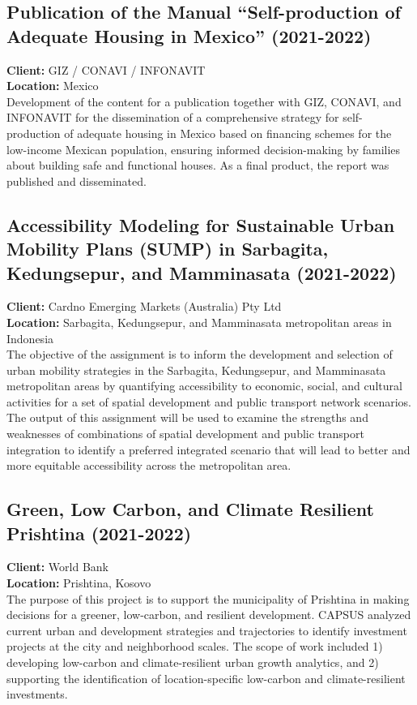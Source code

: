 \documentclass[
	a4paper,
	12pt,
	unnumberedsections,
]{CSSullivanBusinessReport}
\begin{document}
\subsection{Publication of the Manual “Self-production of Adequate Housing in Mexico” (2021-2022)}
\textbf{Client:}  GIZ / CONAVI / INFONAVIT \\
\textbf{Location:}  Mexico \\[0.5em]
 Development of the content for a publication together with GIZ, CONAVI, and INFONAVIT for the dissemination of a comprehensive strategy for self-production of adequate housing in Mexico based on financing schemes for the low-income Mexican population, ensuring informed decision-making by families about building safe and functional houses. As a final product, the report was published and disseminated.

\subsection{Accessibility Modeling for Sustainable Urban Mobility Plans (SUMP) in Sarbagita, Kedungsepur, and Mamminasata (2021-2022)}
\textbf{Client:}  Cardno Emerging Markets (Australia) Pty Ltd \\
\textbf{Location:}  Sarbagita, Kedungsepur, and Mamminasata metropolitan areas in Indonesia \\[0.5em]
 The objective of the assignment is to inform the development and selection of urban mobility strategies in the Sarbagita, Kedungsepur, and Mamminasata metropolitan areas by quantifying accessibility to economic, social, and cultural activities for a set of spatial development and public transport network scenarios. The output of this assignment will be used to examine the strengths and weaknesses of combinations of spatial development and public transport integration to identify a preferred integrated scenario that will lead to better and more equitable accessibility across the metropolitan area.

\subsection{Green, Low Carbon, and Climate Resilient Prishtina (2021-2022)}
\textbf{Client:}  World Bank \\
\textbf{Location:}  Prishtina, Kosovo \\[0.5em]
 The purpose of this project is to support the municipality of Prishtina in making decisions for a greener, low-carbon, and resilient development. CAPSUS analyzed current urban and development strategies and trajectories to identify investment projects at the city and neighborhood scales. The scope of work included 1) developing low-carbon and climate-resilient urban growth analytics, and 2) supporting the identification of location-specific low-carbon and climate-resilient investments.
\end{document}
